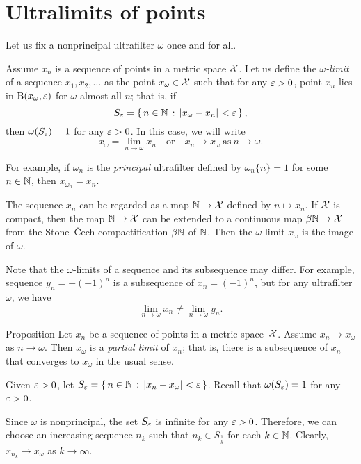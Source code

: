 \section{Ultralimits of points}
\label{ultralimits}

Let us fix a nonprincipal  ultrafilter $\omega$ once and for all.

Assume $x_n$ is a sequence of points in a metric space $\mathcal{X}$. 
Let us define the \emph{$\omega$-limit} of a sequence $x_1,x_2,\dots$ as the point $x_\omega\in\mathcal{X}$ 
such that for any $\varepsilon>0$, point $x_n$ lies in $\mathrm{B}{}(x_\omega,\varepsilon)$ for $\omega$-almost all $n$; 
that is, if 
\[S_\eps=\set{n\in\NN}{\dist{x_\omega}{x_n}{}<\eps},\]
then $\omega(S_\varepsilon)=1$ for any $\varepsilon>0$.
In this case, we will write 
\[x_\omega=\lim_{n\to\omega} x_n
\quad\text{or}\quad 
x_n\to x_\omega\ \text{as}\ n\to\omega.\]

For example, if $\omega_n$ is the \textit{principal} ultrafilter defined by $\omega_n\{n\}=1$ for some $n\in\mathbb{N}$, then
$x_{\omega_n}=x_n$.

The sequence $x_n$ can be regarded as a map $\mathbb{N}\to\mathcal{X}$ defined by $n\mapsto x_n$.
If $\mathcal{X}$ is compact, then the map $\mathbb{N}\to\mathcal{X}$ can be extended to a continuous map $\beta\mathbb{N}\to\mathcal{X}$ from the Stone--\v{C}ech compactification $\beta\mathbb{N}$ of $\mathbb{N}$.
Then the $\omega$-limit $x_\omega$ is the image of $\omega$.

Note that the $\omega$-limits of a sequence and its subsequence may differ.
For example, sequence $y_n=-(-1)^n$ is a subsequence of $x_n=(-1)^n$, but for any ultrafilter $\omega$, we have
\[\lim_{n\to\omega}x_n
\ne
\lim_{n\to\omega}y_n.\] 

\begin{thm}{Proposition}\label{prop:ultra/partial}
Let $x_n$ be a sequence of points in a metric space~$\mathcal{X}$.
Assume $x_n\to x_\omega$ as $n\to\omega$.
Then $x_\omega$ is a \emph{partial limit} of $x_n$;
that is, there is a subsequence of $x_n$ that converges to $x_\omega$ in the usual sense.
\end{thm}

Given $\varepsilon>0$, 
let $S_\eps=\set{n\in\NN}{\dist{x_n}{x_\omega}{}<\eps}$.
Recall that $\omega(S_\varepsilon)=1$ for any $\varepsilon>0$.

Since $\omega$ is nonprincipal, the set $S_\varepsilon$ is infinite for any $\varepsilon>0$.
Therefore, we can choose an increasing sequence $n_k$
such that $n_k\in S_{\frac1k}$ for each $k\in \mathbb{N}$.
Clearly, $x_{n_k}\to x_\omega$ as $k\to\infty$.
\qeds

